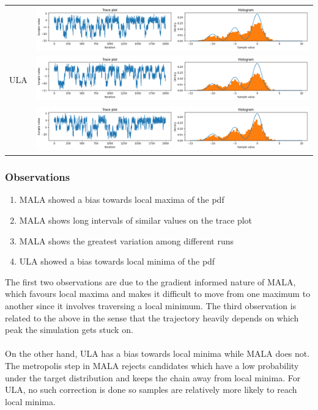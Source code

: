\documentclass{article}
\theoremstyle{definition}
\newcommand{\1}{\mathbbm{1}}
\begin{document}
{\begin{tabular}{|l|l|}
		\multirow{3}{*}{ULA} & \multicolumn{1}{l}{\includegraphics[width=0.8\linewidth, height=0.1\linewidth, valign=m]{diagnostics/ULA1.png}} \\
& \multicolumn{1}{l}{\includegraphics[width=0.8\linewidth, height=0.1\linewidth, valign=m]{diagnostics/ULA2.png}} \\
& \multicolumn{1}{l}{\includegraphics[width=0.8\linewidth, height=0.1\linewidth, valign=m]{diagnostics/ULA3.png}} \\
\hline
	\end{tabular}
}

\subsubsection{Observations}
\begin{enumerate}
	\item MALA showed a bias towards local maxima of the pdf
	\item MALA shows long intervals of similar values on the trace plot
	\item MALA shows the greatest variation among different runs
	\item ULA showed a bias towards local minima of the pdf
\end{enumerate}
The first two observations are due to the gradient informed nature of MALA, which favours local maxima and makes it difficult to move from one maximum to another since it involves traversing a local minimum. The third observation is related to the above in the sense that the trajectory heavily depends on which peak the simulation gets stuck on.
\\\\
On the other hand, ULA has a bias towards local minima while MALA does not. The metropolis step in MALA rejects candidates which have a low probability under the target distribution and keeps the chain away from local minima. For ULA, no such correction is done so samples are relatively more likely to reach local minima.
\end{document}
